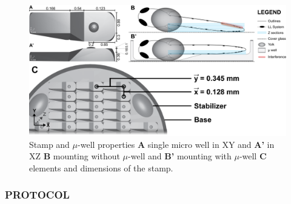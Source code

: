 \documentclass[11pt,singlespacinge,twoside]{reedthesis} %
\begin{document}
\begin{figure}

{\centering \includegraphics[width=0.8\linewidth]{figure/02-MaMo/Mount/mountmicro} 

}

\caption[Stamp and micro-well properties]{Stamp and \(\mu\)-well properties \textbf{A} single micro well in XY and \textbf{A'} in XZ \textbf{B} mounting without \(\mu\)-well and \textbf{B'} mounting with \(\mu\)-well \textbf{C} elements and dimensions of the stamp.}\label{fig:Mountmicro}
\end{figure}
\hypertarget{protocol}{%
\subsubsection{\texorpdfstring{\textbf{PROTOCOL}}{PROTOCOL}}\label{protocol}}
\end{document}
